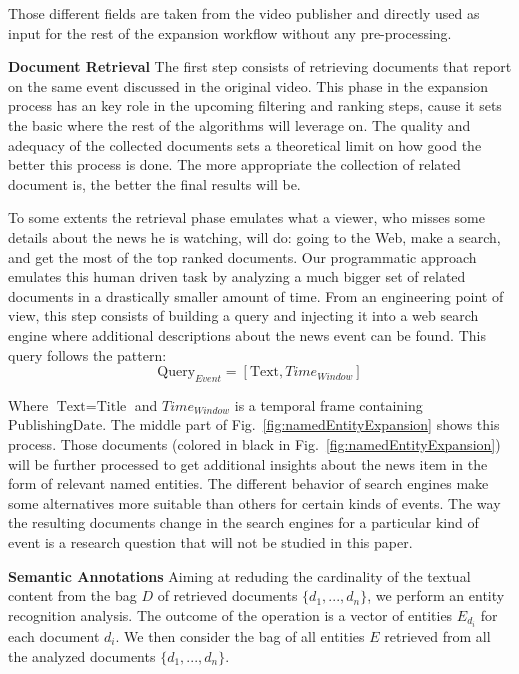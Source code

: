 \documentclass{llncs}
\begin{document}
Those different fields are taken from the video publisher and directly used as input for the rest of the expansion workflow without any pre-processing.

{\bf Document Retrieval}
The first step consists of retrieving documents that report on the same event discussed in the original video. This phase in the expansion process has an key role in the upcoming filtering and ranking steps, cause it sets the basic where the rest of the algorithms will leverage on. The quality and adequacy of the collected documents sets a theoretical limit on how good the better this process is done. The more appropriate the collection of related document is, the better the final results will be.

To some extents the retrieval phase emulates what a viewer, who misses some details about the news he is watching, will do: going to the Web, make a search, and get the most of the top ranked documents. Our programmatic approach emulates this human driven task by analyzing a much bigger set of related documents in a drastically smaller amount of time. From an engineering point of view, this step consists of building a query and injecting it into a web search engine where additional descriptions about the news event can be found. This query follows the pattern:
\begin{equation}
\text{Query}_{Event} =\left [ \text{Text}, Time_{Window} \right ]
\end{equation}

Where $\text{Text}=\text{Title}$ and $Time_{Window}$ is a temporal frame containing $\text{PublishingDate}$. The middle part of Fig.~\ref{fig:namedEntityExpansion} shows this process. Those documents (colored in black in Fig.~\ref{fig:namedEntityExpansion}) will be further processed to get additional insights about the news item in the form of relevant named entities. The different behavior of search engines make some alternatives more suitable than others for certain kinds of events. The way the resulting documents change in the search engines for a particular kind of event is a research question that will not be studied in this paper. 

{\bf Semantic Annotations} Aiming at reduding the cardinality of the textual content from the bag $D$ of retrieved documents $\{d_1, ..., d_n\}$, we perform an entity recognition analysis. The outcome of the operation is a vector of entities $E_{d_i}$ for each document $d_i$. We then consider the bag of all entities $E$ retrieved from all the analyzed documents $\{d_1, ..., d_n\}$. 
\end{document}
